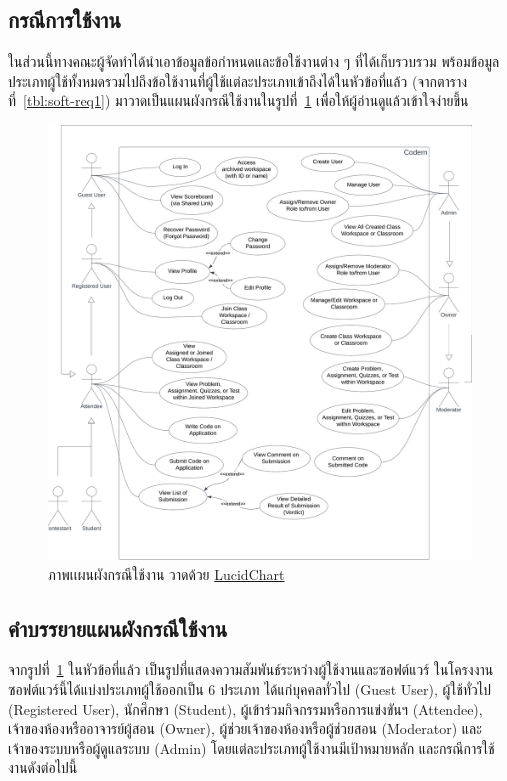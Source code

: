 \documentclass[12pt,one side,openright,a4paper]{cpe-thesis-th}
\newcommand{\thaijustify}[1]{%
  \par\hspace{30pt}\justifying
  #1
}
\begin{document}
\subsection{กรณีการใช้งาน}
\thaijustify{
  ในส่วนนี้ทางคณะผู้จัดทำได้นำเอาข้อมูลข้อกำหนดและข้อใช้งานต่าง ๆ ที่ได้เก็บรวบรวม พร้อมข้อมูลประเภทผู้ใช้ทั้งหมดรวมไปถึงข้อใช้งานที่ผู้ใช้แต่ละประเภทเข้าถึงได้ในหัวข้อที่แล้ว  (จากตารางที่~\ref{tbl:soft-req1}) มาวาดเป็นแผนผังกรณีใช้งานในรูปที่~\ref{fig:usecase} เพื่อให้ผู้อ่านดูแล้วเข้าใจง่ายขึ้น
}
\hypertarget{usecase}{
  \begin{figure}[!h]
    \centering
    \includegraphics[width=15cm]{figure/diagram/usecase-v5.png}
    \caption[ภาพเเผนผังกรณีใช้งาน]{ภาพเเผนผังกรณีใช้งาน วาดด้วย \href{https://lucid.app/}{LucidChart}}
    \label{fig:usecase}
  \end{figure}
}
\pagebreak
\subsection{คำบรรยายแผนผังกรณีใช้งาน}
\thaijustify{
  จากรูปที่~\ref{fig:usecase} ในหัวข้อที่แล้ว เป็นรูปที่แสดงความสัมพันธ์ระหว่างผู้ใช้งานและซอฟต์แวร์ ในโครงงานซอฟต์แวร์นี้ได้แบ่งประเภทผู้ใช้ออกเป็น 6 ประเภท ได้แก่บุคคลทั่วไป (Guest User), ผู้ใช้ทั่วไป (Registered User), นักศึกษา (Student), ผู้เข้าร่วมกิจกรรมหรือการแข่งขันฯ (Attendee), เจ้าของห้องหรืออาจารย์ผู้สอน (Owner), ผู้ช่วยเจ้าของห้องหรือผู้ช่วยสอน (Moderator) และเจ้าของระบบหรือผู้ดูแลระบบ (Admin) โดยแต่ละประเภทผู้ใช้งานมีเป้าหมายหลัก และกรณีการใช้งานดังต่อไปนี้
}
\end{document}
